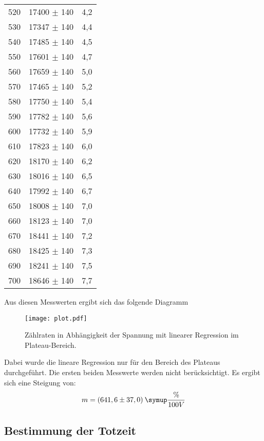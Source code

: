 \begin{table}[H]
\begin{tabular}{c c c}
    520 &	17400 $\pm$ 140 &	4,2 \\
    530 &	17347 $\pm$ 140 &	4,4 \\
    540 &	17485 $\pm$ 140 &	4,5 \\
    550 &	17601 $\pm$ 140 &	4,7 \\
    560 &	17659 $\pm$ 140 &	5,0 \\
    570 &	17465 $\pm$ 140 &	5,2 \\
    580 &	17750 $\pm$ 140 &	5,4 \\
    590 &	17782 $\pm$ 140 &	5,6 \\
    600 &	17732 $\pm$ 140 &	5,9 \\
    610 &	17823 $\pm$ 140 &	6,0 \\
    620 &	18170 $\pm$ 140 &	6,2 \\
    630 &	18016 $\pm$ 140 &	6,5 \\
    640 &	17992 $\pm$ 140 &	6,7 \\
    650 &	18008 $\pm$ 140 &	7,0 \\
    660 &	18123 $\pm$ 140 &	7,0 \\
    670 &	18441 $\pm$ 140 &	7,2 \\
    680 &	18425 $\pm$ 140 &	7,3 \\
    690 &	18241 $\pm$ 140 &	7,5 \\
    700 &	18646 $\pm$ 140 &	7,7 \\
    \bottomrule
  \end{tabular}
\end{table}

Aus diesen Messwerten ergibt sich das folgende Diagramm

\begin{figure}
  \centering
  \texttt{[image: plot.pdf]}
  \caption{Zählraten in Abhängigkeit der Spannung mit linearer Regression im Plateau-Bereich.}
  \label{fig:plot}
\end{figure}

Dabei wurde die lineare Regression nur für den Bereich des Plateaus durchgeführt. Die ersten beiden
Messwerte werden nicht berücksichtigt.
Es ergibt sich eine Steigung von:
\begin{equation*}
  m = (641,6 \pm 37,0) \: \symup{\frac{\%}{100V}}
\end{equation*}








\subsection{Bestimmung der Totzeit}

